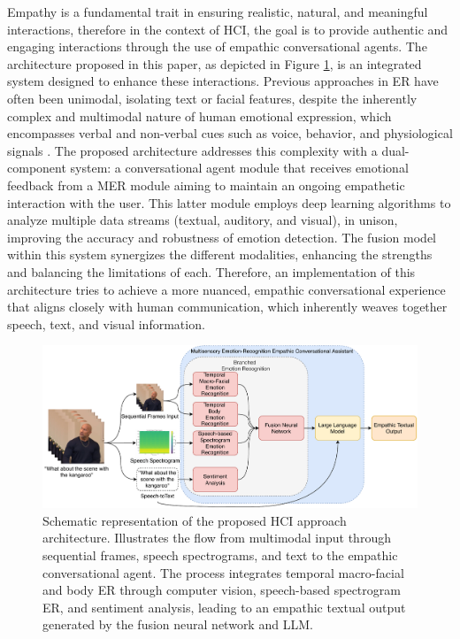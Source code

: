 \documentclass[runningheads]{llncs}
\begin{document}
Empathy is a fundamental trait in ensuring realistic, natural, and meaningful interactions, therefore in the context of HCI, the goal is to provide authentic and engaging interactions through the use of empathic conversational agents. The architecture proposed in this paper, as depicted in Figure \ref{fig:approachArchitecture}, is an integrated system designed to enhance these interactions. Previous approaches in ER have often been unimodal, isolating text or facial features, despite the inherently complex and multimodal nature of human emotional expression, which encompasses verbal and non-verbal cues such as voice, behavior, and physiological signals \cite{ezzameli_emotion_2023, zhu_multimodal_2023}. The proposed architecture addresses this complexity with a dual-component system: a conversational agent module that receives emotional feedback from a MER module aiming to maintain an ongoing empathetic interaction with the user. This latter module employs deep learning algorithms to analyze multiple data streams (textual, auditory, and visual), in unison, improving the accuracy and robustness of emotion detection. The fusion model within this system synergizes the different modalities, enhancing the strengths and balancing the limitations of each. Therefore, an implementation of this architecture tries to achieve a more nuanced, empathic conversational experience that aligns closely with human communication, which inherently weaves together speech, text, and visual information.

\begin{figure}[htb]
	\centering
	\includegraphics[width=0.97\linewidth]{approachArchitecture.pdf}
	\caption{Schematic representation of the proposed HCI approach architecture. Illustrates the flow from multimodal input through sequential frames, speech spectrograms, and text to the empathic conversational agent. The process integrates temporal macro-facial and body ER through computer vision, speech-based spectrogram ER, and sentiment analysis, leading to an empathic textual output generated by the fusion neural network and LLM.}
	\label{fig:approachArchitecture}
\end{figure}
\end{document}
